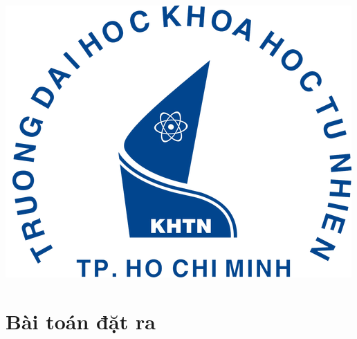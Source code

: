 \begin{titlepage}




\includegraphics{logo/rsz_3logo-khtn.png}\\[1cm] %
 

\vfill %

\end{titlepage}


\section{Bài toán đặt ra}

